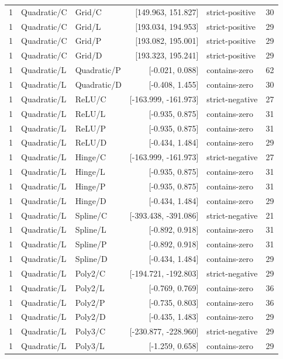\begin{longtable}{lllrlr}
1 & Quadratic/C & Grid/C & [149.963, 151.827] & strict-positive & 30 \\
1 & Quadratic/C & Grid/L & [193.034, 194.953] & strict-positive & 29 \\
1 & Quadratic/C & Grid/P & [193.082, 195.001] & strict-positive & 29 \\
1 & Quadratic/C & Grid/D & [193.323, 195.241] & strict-positive & 29 \\
1 & Quadratic/L & Quadratic/P & [-0.021, 0.088] & contains-zero & 62 \\
1 & Quadratic/L & Quadratic/D & [-0.408, 1.455] & contains-zero & 30 \\
1 & Quadratic/L & ReLU/C & [-163.999, -161.973] & strict-negative & 27 \\
1 & Quadratic/L & ReLU/L & [-0.935, 0.875] & contains-zero & 31 \\
1 & Quadratic/L & ReLU/P & [-0.935, 0.875] & contains-zero & 31 \\
1 & Quadratic/L & ReLU/D & [-0.434, 1.484] & contains-zero & 29 \\
1 & Quadratic/L & Hinge/C & [-163.999, -161.973] & strict-negative & 27 \\
1 & Quadratic/L & Hinge/L & [-0.935, 0.875] & contains-zero & 31 \\
1 & Quadratic/L & Hinge/P & [-0.935, 0.875] & contains-zero & 31 \\
1 & Quadratic/L & Hinge/D & [-0.434, 1.484] & contains-zero & 29 \\
1 & Quadratic/L & Spline/C & [-393.438, -391.086] & strict-negative & 21 \\
1 & Quadratic/L & Spline/L & [-0.892, 0.918] & contains-zero & 31 \\
1 & Quadratic/L & Spline/P & [-0.892, 0.918] & contains-zero & 31 \\
1 & Quadratic/L & Spline/D & [-0.434, 1.484] & contains-zero & 29 \\
1 & Quadratic/L & Poly2/C & [-194.721, -192.803] & strict-negative & 29 \\
1 & Quadratic/L & Poly2/L & [-0.769, 0.769] & contains-zero & 36 \\
1 & Quadratic/L & Poly2/P & [-0.735, 0.803] & contains-zero & 36 \\
1 & Quadratic/L & Poly2/D & [-0.435, 1.483] & contains-zero & 29 \\
1 & Quadratic/L & Poly3/C & [-230.877, -228.960] & strict-negative & 29 \\
1 & Quadratic/L & Poly3/L & [-1.259, 0.658] & contains-zero & 29 \\

\end{longtable}
